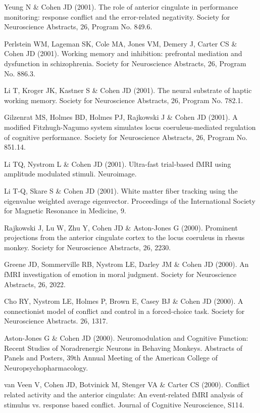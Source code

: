 \documentclass[10 pt]{article}
\begin{document}
Yeung N \& Cohen JD (2001). The role of anterior cingulate in performance monitoring: response conflict and the error-related negativity. Society for Neuroscience Abstracts, 26, Program No. 849.6.

Perlstein WM, Lageman SK, Cole MA, Jones VM, Demery J, Carter CS \& Cohen JD (2001). Working memory and inhibition: prefrontal mediation and dysfunction in schizophrenia. Society for Neuroscience Abstracts, 26, Program No. 886.3.

Li T, Kroger JK, Kastner S \& Cohen JD (2001). The neural substrate of haptic working memory. Society for Neuroscience Abstracts, 26, Program No. 782.1.

Gilzenrat MS, Holmes BD, Holmes PJ, Rajkowski J \& Cohen JD (2001). A modified Fitzhugh-Nagumo system simulates locus coeruleus-mediated regulation of cognitive performance. Society for Neuroscience Abstracts, 26, Program No. 851.14.

Li TQ, Nystrom L \& Cohen JD (2001). Ultra-fast trial-based fMRI using amplitude modulated stimuli. Neuroimage.

Li T-Q, Skare S \& Cohen JD (2001). White matter fiber tracking using the eigenvalue weighted average eigenvector. Proceedings of the International Society for Magnetic Resonance in Medicine, 9.

Rajkowski J, Lu W, Zhu Y, Cohen JD \& Aston-Jones G (2000). Prominent projections from the anterior cingulate cortex to the locus coeruleus in rhesus monkey. Society for Neuroscience Abstracts, 26, 2230.

Greene JD, Sommerville RB, Nystrom LE, Darley JM \& Cohen JD (2000). An fMRI investigation of emotion in moral judgment. Society for Neuroscience Abstracts, 26, 2022.

Cho RY, Nystrom LE, Holmes P, Brown E, Casey BJ \& Cohen JD (2000). A connectionist model of conflict and control in a forced-choice task. Society for Neuroscience Abstracts. 26, 1317.

Aston-Jones G \& Cohen JD (2000). Neuromodulation and Cognitive Function: Recent Studies of Noradrenergic Neurons in Behaving Monkeys. Abstracts of Panels and Posters, 39th Annual Meeting of the American College of Neuropsychopharmacology.

van Veen V, Cohen JD, Botvinick M, Stenger VA \& Carter CS (2000). Conflict related activity and the anterior cingulate: An event-related fMRI analysis of stimulus vs. response based conflict. Journal of Cognitive Neuroscience, S114.
\end{document}

